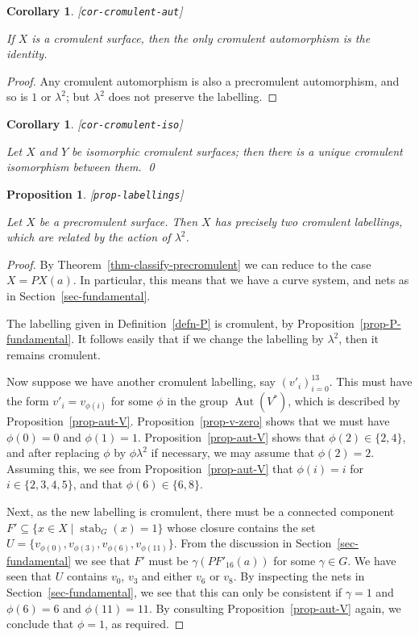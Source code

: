 \documentclass[reqno]{amsart}
\newcommand{\lbl}[1]{\label{#1}\textup{[\texttt{#1}]}\par}
\newcommand{\lbl}{\label}
\newcommand{\Aut}	{\operatorname{Aut}}
\newcommand{\stab}	{\operatorname{stab}}
\newcommand{\gm}        {\gamma}
\newcommand{\lm}        {\lambda}
\newcommand{\st}        {\;|\;}
\newcommand{\sse}       {\subseteq}
\renewcommand{\:}{\colon}
\newtheorem{proposition}[theorem]{Proposition}
\newtheorem{corollary}[theorem]{Corollary}
\theoremstyle{definition}
\begin{document}
\begin{corollary}\lbl{cor-cromulent-aut}
 If $X$ is a cromulent surface, then the only cromulent automorphism
 is the identity.
\end{corollary}
\begin{proof}
 Any cromulent automorphism is also a precromulent automorphism, and
 so is $1$ or $\lm^2$; but $\lm^2$ does not preserve the labelling.
\end{proof}

\begin{corollary}\lbl{cor-cromulent-iso}
 Let $X$ and $Y$ be isomorphic cromulent surfaces; then there is a
 unique cromulent isomorphism between them. \qed
\end{corollary}

\begin{proposition}\lbl{prop-labellings}
 Let $X$ be a precromulent surface.  Then $X$ has precisely two
 cromulent labellings, which are related by the action of $\lm^2$.
\end{proposition}
\begin{proof}
 By Theorem~\ref{thm-classify-precromulent} we can reduce to the
 case $X=PX(a)$.  In particular, this means that we have a curve
 system, and nets as in Section~\ref{sec-fundamental}.

 The labelling given in Definition~\ref{defn-P} is cromulent, by
 Proposition~\ref{prop-P-fundamental}.  It follows easily that if we
 change the labelling by $\lm^2$, then it remains cromulent.

 Now suppose we have another cromulent labelling, say
 $(v'_i)_{i=0}^{13}$.  This must have the form $v'_i=v_{\phi(i)}$ for
 some $\phi$ in the group $\Aut(V^*)$, which is described by
 Proposition~\ref{prop-aut-V}.  Proposition~\ref{prop-v-zero} shows
 that we must have $\phi(0)=0$ and $\phi(1)=1$.
 Proposition~\ref{prop-aut-V} shows that $\phi(2)\in\{2,4\}$, and
 after replacing $\phi$ by $\phi\lm^2$ if necessary, we may assume
 that $\phi(2)=2$.  Assuming this, we see from
 Proposition~\ref{prop-aut-V} that $\phi(i)=i$ for $i\in\{2,3,4,5\}$,
 and that $\phi(6)\in\{6,8\}$.

 Next, as the new labelling is cromulent, there must be a connected
 component $F'\sse\{x\in X\st\stab_G(x)=1\}$ whose closure contains
 the set $U=\{v_{\phi(0)},v_{\phi(3)},v_{\phi(6)},v_{\phi(11)}\}$.
 From the discussion in Section~\ref{sec-fundamental} we see that $F'$
 must be $\gm(PF'_{16}(a))$ for some $\gm\in G$.  We have seen that
 $U$ contains $v_0$, $v_3$ and either $v_6$ or $v_8$.  By inspecting
 the nets in Section~\ref{sec-fundamental}, we see that this can only
 be consistent if $\gm=1$ and $\phi(6)=6$ and $\phi(11)=11$.  By
 consulting Proposition~\ref{prop-aut-V} again, we conclude that
 $\phi=1$, as required.
\end{proof}
\end{document}
